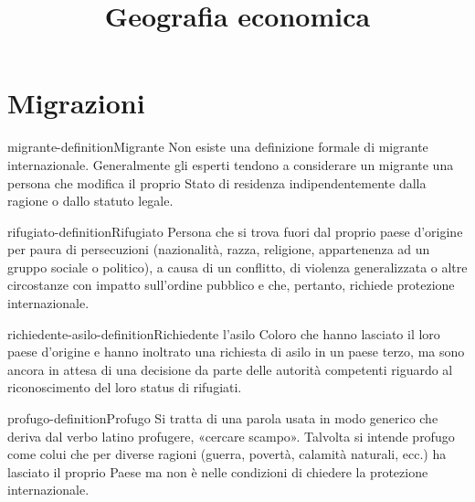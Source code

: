\documentclass[preview]{standalone}
\begin{document}
\title{Geografia economica}
\genpage

\section{Migrazioni}

\begin{snippetdefinition}{migrante-definition}{Migrante}
    Non esiste una definizione formale di migrante internazionale. Generalmente gli esperti tendono a considerare un migrante una persona che
    modifica il proprio Stato di residenza indipendentemente dalla ragione
    o dallo statuto legale.
\end{snippetdefinition}

\begin{snippetdefinition}{rifugiato-definition}{Rifugiato}
    Persona che si trova fuori dal proprio paese d'origine per paura di persecuzioni
    (nazionalità, razza, religione, appartenenza ad un gruppo sociale o politico),
    a causa di un conflitto, di violenza generalizzata o altre
    circostanze con impatto sull'ordine pubblico e che, pertanto, richiede
    protezione internazionale.
\end{snippetdefinition}

\begin{snippetdefinition}{richiedente-asilo-definition}{Richiedente l'asilo}
    Coloro che hanno lasciato il loro paese d'origine e hanno inoltrato una
    richiesta di asilo in un paese terzo, ma sono ancora in attesa di una
    decisione da parte delle autorità competenti riguardo al riconoscimento
    del loro status di rifugiati.
\end{snippetdefinition}

\begin{snippetdefinition}{profugo-definition}{Profugo}
    Si tratta di una parola usata in modo generico che deriva dal verbo latino
    profugere, «cercare scampo». Talvolta si intende profugo come
    colui che per diverse ragioni (guerra, povertà, calamità naturali, ecc.) ha
    lasciato il proprio Paese ma non è nelle condizioni di chiedere la protezione internazionale.
\end{snippetdefinition}

\newcommand{\greenbox}{
    \fcolorbox{black}{green}{\rule{0pt}{5pt}\rule{5pt}{0pt}}
}

\newcommand{\redbox}{
    \fcolorbox{black}{red}{\rule{0pt}{5pt}\rule{5pt}{0pt}}
}
\end{document}

